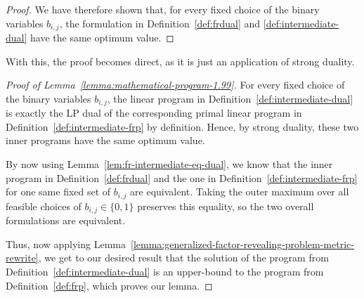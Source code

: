 \begin{proof}
    
    We have therefore shown that, for every fixed choice of the binary variables $b_{i,j}$, the formulation in Definition~\ref{def:frdual} and \ref{def:intermediate-dual} have the same optimum value. 
\end{proof}

With this, the proof becomes direct, as it is just an application of strong duality.

\begin{proof}[Proof of Lemma~\ref{lemma:mathematical-program-1.99}]
    For every fixed choice of the binary variables $b_{i,j}$, the linear program in Definition~\ref{def:intermediate-dual} is exactly the LP dual of the corresponding primal linear program in Definition~\ref{def:intermediate-frp} by definition. Hence, by strong duality, these two inner programs have the same optimum value. 
    
    By now using Lemma~\ref{lem:fr-intermediate-eq-dual}, we know that the inner program in Definition~\ref{def:frdual} and the one in Definition~\ref{def:intermediate-frp} for one same fixed set of $b_{i,j}$ are equivalent.
    Taking the outer maximum over all feasible choices of $b_{i,j}\in\{0,1\}$ preserves this equality, so the two overall formulations are equivalent.

    Thus, now applying Lemma~\ref{lemma:generalized-factor-revealing-problem-metric-rewrite}, we get to our desired result that the solution of the program from Definition~\ref{def:intermediate-dual} is an upper-bound to the program from Definition~\ref{def:frp}, which proves our lemma.
\end{proof}

